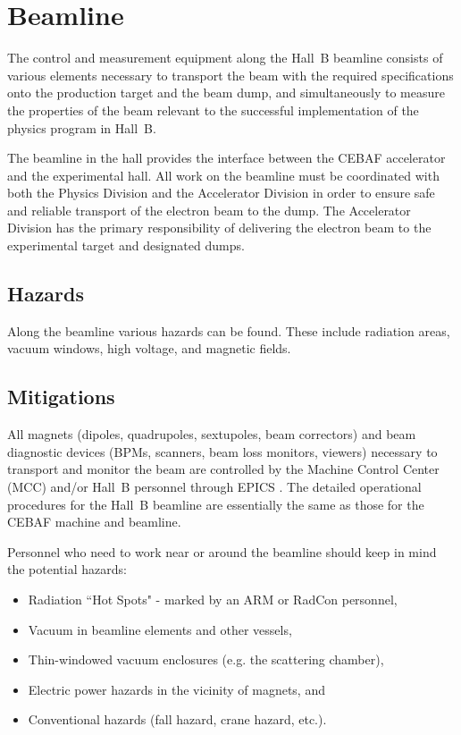 \section{Beamline}

The control and measurement equipment along the Hall~B beamline consists of various 
elements necessary to transport the beam with the required specifications onto the 
production target and the beam dump, and simultaneously to measure the properties of 
the beam relevant to the successful implementation of the physics program in Hall~B. 

The beamline in the hall provides the interface between the CEBAF accelerator and the 
experimental hall. All work on the beamline must be coordinated with both the Physics 
Division and the Accelerator Division in order to ensure safe and reliable transport of 
the electron beam to the dump. The Accelerator Division has the primary responsibility 
of delivering the electron beam to the experimental target and designated dumps.

\subsection{Hazards} 

Along the beamline various hazards can be found. These include radiation areas, vacuum 
windows, high voltage, and magnetic fields.

\subsection{Mitigations}

All magnets (dipoles, quadrupoles, sextupoles, beam correctors) and beam diagnostic devices 
(BPMs, scanners, beam loss monitors, viewers) necessary to transport and monitor the beam 
are controlled by the Machine Control Center (MCC) and/or Hall~B personnel through EPICS 
\cite{epics}. The detailed operational procedures for the Hall~B beamline are essentially 
the same as those for the CEBAF machine and beamline.

Personnel who need to work near or around the beamline should keep in mind the potential 
hazards:
\begin{itemize}
\item Radiation ``Hot Spots" - marked by an ARM or RadCon personnel,
\item Vacuum in beamline elements and other vessels,
\item Thin-windowed vacuum enclosures (e.g. the scattering chamber),
\item Electric power hazards in the vicinity of magnets, and 
\item Conventional hazards (fall hazard, crane hazard, etc.). 
\end{itemize} 

